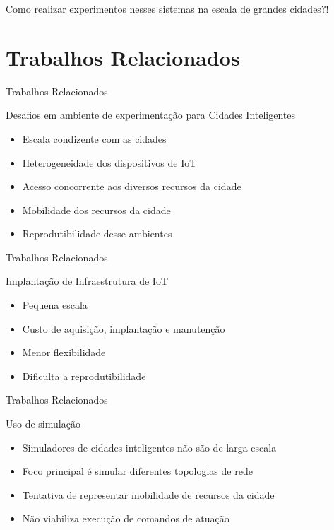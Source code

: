 \documentclass[xcolor={usenames,svgnames,dvipsnames},brazil,english,12pt,aspectratio=149]{beamer}
\begin{document}
\begin{frame}[standout]
	Como realizar experimentos nesses sistemas na escala de grandes cidades?!
\end{frame}

\section{Trabalhos Relacionados}

\begin{frame}{Trabalhos Relacionados}
    \begin{block}{Desafios em ambiente de experimentação para Cidades Inteligentes}
        \begin{itemize}
            \item Escala condizente com as cidades
            \item Heterogeneidade dos dispositivos de IoT
            \item Acesso concorrente aos diversos recursos da cidade
            \item Mobilidade dos recursos da cidade
            \item Reprodutibilidade desse ambientes
        \end{itemize}
    \end{block}
\end{frame}

\begin{frame}{Trabalhos Relacionados}
  \begin{block}{Implantação de Infraestrutura de IoT}
    \begin{itemize}
      \item Pequena escala
      \item Custo de aquisição, implantação e manutenção
      \item Menor flexibilidade
      \item Dificulta a reprodutibilidade
    \end{itemize}
  \end{block}
\end{frame}

\begin{frame}{Trabalhos Relacionados}
  \begin{block}{Uso de simulação}
    \begin{itemize}
      \item Simuladores de cidades inteligentes não são de larga escala
      \item Foco principal é simular diferentes topologias de rede
      \item Tentativa de representar mobilidade de recursos da cidade
      \item Não viabiliza execução de comandos de atuação
    \end{itemize}
  \end{block}
\end{frame}
\end{document}
